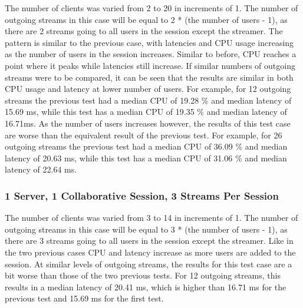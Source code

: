 The number of clients was varied from 2 to 20 in increments of 1. The number of outgoing streams in this case will be equal to 2 * (the number of users - 1), as there are 2 streams going to all users in the session except the streamer. The pattern is similar to the previous case, with latencies and CPU usage increasing as the number of users in the session increases. Similar to before, CPU reaches a point where it peaks while latencies still increase. If similar numbers of outgoing streams were to be compared, it can be seen that the results are similar in both CPU usage and latency at lower number of users. For example, for 12 outgoing streams the previous test had a median CPU of 19.28 \% and median latency of 15.69 ms, while this test has a median CPU of 19.35 \% and median latency of 16.71ms. As the number of users increases however, the results of this test case are worse than the equivalent result of the previous test. For example, for 26 outgoing streams the previous test had a median CPU of 36.09 \% and median latency of 20.63 ms, while this test has a median CPU of 31.06 \% and median latency of 22.64 ms.

\subsubsection{1 Server, 1 Collaborative Session, 3 Streams Per Session}
\label{sec:1serv_1sess_3str180}

The number of clients was varied from 3 to 14 in increments of 1. The number of outgoing streams in this case will be equal to 3 * (the number of users - 1), as there are 3 streams going to all users in the session except the streamer. Like in the two previous cases CPU and latency increase as more users are added to the session. At similar levels of outgoing streams, the results for this test case are a bit worse than those of the two previous tests. For 12 outgoing streams, this results in a median latency of 20.41 ms, which is higher than 16.71 ms for the previous test and 15.69 ms for the first test.

